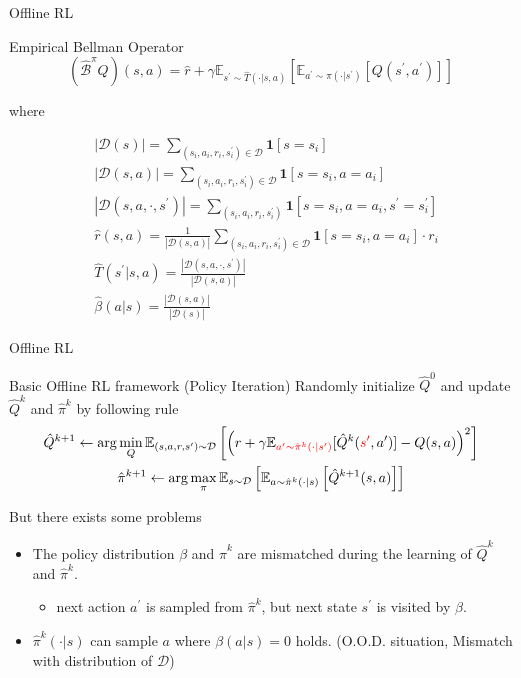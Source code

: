 \documentclass[11pt]{beamer}
\newcommand{\mbb}[1]{\mathbb{#1}}
\newcommand{\mb}[1]{\mathbf{#1}}
\newcommand{\mc}[1]{\mathcal{#1}}
\newcommand{\abs}[1]{\left\lvert #1 \right\rvert}
\begin{document}
\begin{frame}{Offline RL}
  \begin{block}{Empirical Bellman Operator}
    \[
      (\hat{\mc{B}}^\pi Q)(s,a) = \hat{r} + \gamma \mbb{E}_{s^\prime \sim \hat{T}(\cdot | s,a)}\left[\mbb{E}_{a^\prime \sim \pi(\cdot |s^\prime)} \left[ Q(s^\prime,a^\prime) \right]\right]
    \]

    where

    \[
    \begin{aligned}
    &\abs{\mc{D}(s)} = \sum_{(s_i,a_i,r_i,s_i^\prime) \in \mc{D}}\mb{1}[s=s_i] \\
    &\abs{\mc{D}(s,a)} = \sum_{(s_i,a_i,r_i,s^\prime_i)\in\mc{D}}\mb{1}[s=s_i, a=a_i]\\
    &\abs{\mc{D}(s,a,\cdot, s^\prime)} = \sum_{(s_i, a_i, r_i, s^\prime_i)} \mb{1}[s=s_i, a=a_i, s^\prime=s_i^\prime] \\
    &\hat{r}(s,a) = \frac{1}{\abs{\mc{D}(s,a)}} \sum_{(s_i, a_i, r_i, s_i^\prime) \in \mc{D}}\mb{1}[s=s_i,a=a_i]\cdot r_i \\
    &\hat{T}(s^\prime|s,a) = \frac{\abs{\mc{D}(s,a,\cdot, s^\prime)}}{\abs{\mc{D}(s,a)}} \\
    &\hat{\beta}(a|s) = \frac{\abs{\mc{D}(s,a)}}{\abs{\mc{D}(s)}}
    \end{aligned}
    \]
  \end{block}
\end{frame}

\begin{frame}{Offline RL}
  \begin{block}{Basic Offline RL framework (Policy Iteration)}
    Randomly initialize $\hat{Q}^{0}$ and update $\hat{Q}^k$ and $\hat{\pi}^k$ by following rule
    \[
    \begin{gathered}
      \hat{Q}^{k+1} \leftarrow \arg\min_Q \mbb{E}_{(s,a,r,s^\prime) \sim \mc{D}}\left[\left(r + \gamma \mbb{E}_{\textcolor{red}{a^\prime \sim \hat{\pi}^k (\cdot | s^\prime)}}[\hat{Q}^k(\textcolor{red}{s^\prime}, a^\prime)]  - Q(s,a)\right)^2\right] \\
      \hat{\pi}^{k+1} \leftarrow \arg\max_\pi \mbb{E}_{s \sim \mc{D}} \left[\mbb{E}_{a \sim \hat{\pi}^k(\cdot|s)} \left[\hat{Q}^{k+1}(s,a)\right]\right]
    \end{gathered}
    \]
  \end{block}
  But there exists some problems
  \begin{itemize}
    \item The policy distribution $\beta$ and $\hat{\pi}^k$ are mismatched during the learning of $\hat{Q}^k$ and $\hat{\pi}^k$.
    \begin{itemize}
      \item next action $a^\prime$ is sampled from $\hat{\pi}^k$, but next state $s^\prime$ is visited by $\beta$.
    \end{itemize}
    \item $\hat{\pi}^k(\cdot|s)$ can sample $a$ where $\beta(a|s) = 0$ holds. (O.O.D. situation, Mismatch with distribution of $\mc{D}$)
  \end{itemize}
\end{frame}
\end{document}
